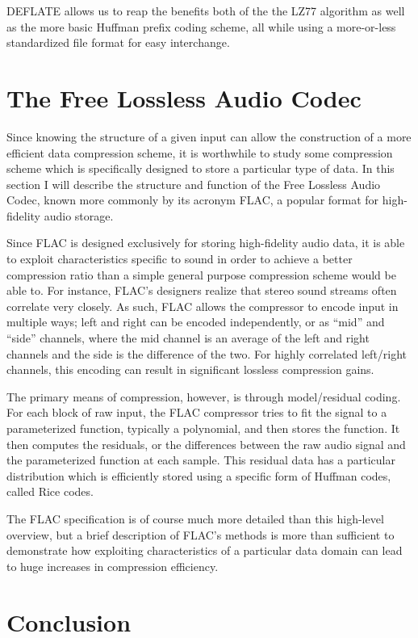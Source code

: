\documentclass[12pt]{article}
\begin{document}
DEFLATE allows us to reap the benefits both of the the LZ77 algorithm
as well as the more basic Huffman prefix coding scheme, all while
using a more-or-less standardized file format for easy interchange.

\section{The Free Lossless Audio Codec}

Since knowing the structure of a given input can allow the
construction of a more efficient data compression scheme, it is
worthwhile to study some compression scheme which is specifically
designed to store a particular type of data. In this section I will
describe the structure and function of the Free Lossless Audio Codec,
known more commonly by its acronym FLAC, a popular format for
high-fidelity audio storage. \cite{flac}

Since FLAC is designed exclusively for storing high-fidelity audio
data, it is able to exploit characteristics specific to sound in order
to achieve a better compression ratio than a simple general purpose
compression scheme would be able to. For instance, FLAC's designers
realize that stereo sound streams often correlate very closely. As
such, FLAC allows the compressor to encode input in multiple ways;
left and right can be encoded independently, or as ``mid'' and
``side'' channels, where the mid channel is an average of the left and
right channels and the side is the difference of the two. For highly
correlated left/right channels, this encoding can result in
significant lossless compression gains.

The primary means of compression, however, is through model/residual
coding. For each block of raw input, the FLAC compressor tries to fit
the signal to a parameterized function, typically a polynomial, and
then stores the function. It then computes the residuals, or the
differences between the raw audio signal and the parameterized
function at each sample. This residual data has a particular
distribution which is efficiently stored using a specific form of
Huffman codes, called Rice codes. \cite{flac}

The FLAC specification is of course much more detailed than this
high-level overview, but a brief description of FLAC's methods is more
than sufficient to demonstrate how exploiting characteristics of a
particular data domain can lead to huge increases in compression
efficiency.

\section{Conclusion}
\end{document}
